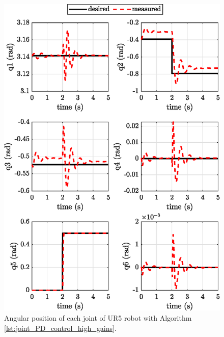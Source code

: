 \begin{figure}
    \centering
    \includegraphics{images/act_1.4/joint_position.eps}
    \caption{Angular position of each joint of UR5 robot with Algorithm \ref{lst:joint_PD_control_high_gains}.}
    \label{fig:act_1.4_joint_position}
\end{figure}

